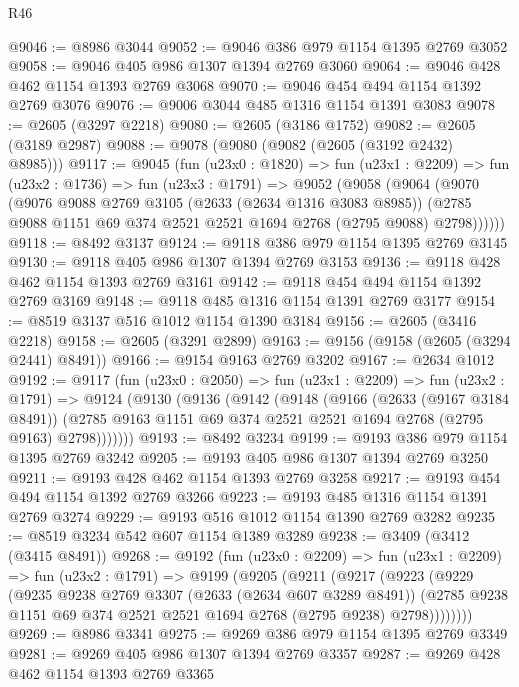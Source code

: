\begin{lexlean}{R46}
\begin{coremodule}
@9046 := @8986 @3044
@9052 := @9046 @386 @979 @1154 @1395 @2769 @3052
@9058 := @9046 @405 @986 @1307 @1394 @2769 @3060
@9064 := @9046 @428 @462 @1154 @1393 @2769 @3068
@9070 := @9046 @454 @494 @1154 @1392 @2769 @3076
@9076 := @9006 @3044 @485 @1316 @1154 @1391 @3083
@9078 := @2605 (@3297 @2218)
@9080 := @2605 (@3186 @1752)
@9082 := @2605 (@3189 @2987)
@9088 := @9078 (@9080 (@9082 (@2605 (@3192 @2432) @8985)))
@9117 := @9045
    (fun (u23x0 : @1820) =>
    fun (u23x1 : @2209) =>
    fun (u23x2 : @1736) =>
    fun (u23x3 : @1791) =>
    @9052
      (@9058
        (@9064
          (@9070
            (@9076
              @9088
              @2769
              @3105
              (@2633 (@2634 @1316 @3083 @8985))
              (@2785 @9088 @1151 @69 @374 @2521 @2521 @1694 @2768 (@2795 @9088) @2798))))))
@9118 := @8492 @3137
@9124 := @9118 @386 @979 @1154 @1395 @2769 @3145
@9130 := @9118 @405 @986 @1307 @1394 @2769 @3153
@9136 := @9118 @428 @462 @1154 @1393 @2769 @3161
@9142 := @9118 @454 @494 @1154 @1392 @2769 @3169
@9148 := @9118 @485 @1316 @1154 @1391 @2769 @3177
@9154 := @8519 @3137 @516 @1012 @1154 @1390 @3184
@9156 := @2605 (@3416 @2218)
@9158 := @2605 (@3291 @2899)
@9163 := @9156 (@9158 (@2605 (@3294 @2441) @8491))
@9166 := @9154 @9163 @2769 @3202
@9167 := @2634 @1012
@9192 := @9117
    (fun (u23x0 : @2050) =>
    fun (u23x1 : @2209) =>
    fun (u23x2 : @1791) =>
    @9124
      (@9130
        (@9136
          (@9142
            (@9148
              (@9166
                (@2633 (@9167 @3184 @8491))
                (@2785 @9163 @1151 @69 @374 @2521 @2521 @1694 @2768 (@2795 @9163) @2798)))))))
@9193 := @8492 @3234
@9199 := @9193 @386 @979 @1154 @1395 @2769 @3242
@9205 := @9193 @405 @986 @1307 @1394 @2769 @3250
@9211 := @9193 @428 @462 @1154 @1393 @2769 @3258
@9217 := @9193 @454 @494 @1154 @1392 @2769 @3266
@9223 := @9193 @485 @1316 @1154 @1391 @2769 @3274
@9229 := @9193 @516 @1012 @1154 @1390 @2769 @3282
@9235 := @8519 @3234 @542 @607 @1154 @1389 @3289
@9238 := @3409 (@3412 (@3415 @8491))
@9268 := @9192
    (fun (u23x0 : @2209) =>
    fun (u23x1 : @2209) =>
    fun (u23x2 : @1791) =>
    @9199
      (@9205
        (@9211
          (@9217
            (@9223
              (@9229
                (@9235
                  @9238
                  @2769
                  @3307
                  (@2633 (@2634 @607 @3289 @8491))
                  (@2785 @9238 @1151 @69 @374 @2521 @2521 @1694 @2768 (@2795 @9238) @2798))))))))
@9269 := @8986 @3341
@9275 := @9269 @386 @979 @1154 @1395 @2769 @3349
@9281 := @9269 @405 @986 @1307 @1394 @2769 @3357
@9287 := @9269 @428 @462 @1154 @1393 @2769 @3365

\end{coremodule}
\end{lexlean}
